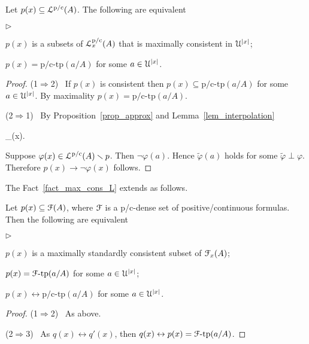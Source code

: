 \documentclass{amsproc}
\newcommand{\mylabel}[1]{{#1}\hfill}
\renewenvironment{itemize}
  {\begin{list}{$\triangleright$}{%
  \setlength{\parskip}{0mm}
  \setlength{\topsep}{.4\baselineskip}
  \setlength{\rightmargin}{0mm}
  \setlength{\listparindent}{0mm}
  \setlength{\itemindent}{0mm}
  \setlength{\labelwidth}{3ex}
  \setlength{\itemsep}{.2\baselineskip}
  \setlength{\parsep}{.2\baselineskip}
  \setlength{\partopsep}{0mm}
  \setlength{\labelsep}{1ex}
  \setlength{\leftmargin}{\labelwidth+\labelsep}
  \let\makelabel\mylabel}}{%
\end{list}}
\begin{document}
{\begin{fact}\label{fact_max_cons_L}
  Let $p(x)\subseteq{\EuScript L}^{\rm p/c}(A)$.
  The following are equivalent
  \begin{itemize}
    \item[1.] $p(x)$ is a subsets of ${\EuScript L}^{\rm p/c}_x(A)$ that is maximally consistent in ${\EuScript U}^{|x|}$;
    \item[2.] $p(x)=\mbox{p/c-tp}(a/A)$ for some $a\in{\EuScript U}^{|x|}$.
  \end{itemize}
\end{fact}

\begin{proof}
  (1$\Rightarrow$2) \ 
  If $p(x)$ is consistent then $p(x)\subseteq\mbox{p/c-tp}(a/A)$  for some $a\in{\EuScript U}^{|x|}$.
  By maximality $p(x)=\mbox{p/c-tp}(a/A)$.

  (2$\Rightarrow$1) \ 
  By Proposition~\ref{prop_approx} and Lemma~\ref{lem_interpolation}

  \ceq{\hfill\varphi(x)}
  {\leftrightarrow}
  {\bigwedge_{\tilde\varphi\perp\varphi}\neg\tilde\varphi(x).}

  Suppose $\varphi(x)\in{\EuScript L}^{\rm p/c}(A)\smallsetminus  p$.
  Then $\neg\varphi(a)$.
  Hence $\tilde\varphi(a)$ holds for some $\tilde\varphi\perp\varphi$.
  Therefore $p(x)\rightarrow\neg\varphi(x)$ follows.
\end{proof}

The Fact~\ref{fact_max_cons_L} extends as follows.

\begin{fact}\label{fact_max_cons_F}
  Let $p(x)\subseteq{\EuScript F}(A)$, where ${\EuScript F}$ is a p/c-dense set of positive/continuous formulas.
  Then the following are equivalent 
  \begin{itemize}
    \item[1.] $p(x)$ is a maximally standardly consistent subset of ${\EuScript F}_x(A)$;
    \item[2.] $p(x)={\EuScript F}\mbox{-tp}(a/A)$ for some $a\in{\EuScript U}^{|x|}$;
    \item[3.] $p(x)\leftrightarrow\mbox{p/c-tp}(a/A)$ for some $a\in{\EuScript U}^{|x|}$.
  \end{itemize}

\end{fact}
  
\begin{proof}
  (1$\Rightarrow$2) \ 
  As above.
  
  (2$\Rightarrow$3) \ 
  As $q(x)\leftrightarrow q'(x)$, then $q(x)\leftrightarrow p(x)={\EuScript F}\mbox{-tp}(a/A)$.


\end{proof}}
\end{document}
